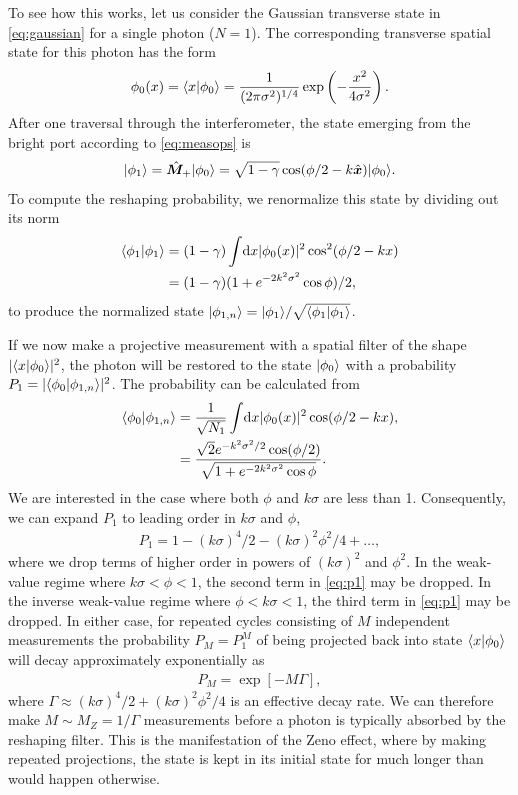 To see how this works, let us consider the Gaussian transverse state in \eqref{eq:gaussian} for a single photon ($N=1$).  The corresponding transverse spatial state for this photon has the form
\begin{align}
  \phi_0(x) = \langle x \vert \phi_0 \rangle = \frac{1}{(2 \pi \sigma^2)^{1/4}} \exp \left( - \frac{x^2}{4 \sigma^2}\right).
\end{align}
After one traversal through the interferometer, the state emerging from the bright port according to \eqref{eq:measops} is  
\begin{align}
  \lvert \phi_1\rangle = \hat{\bm M}_+ \lvert \phi_0\rangle = \sqrt{1-\gamma} \cos( \phi/2 - k  \hat{\bm x}) \lvert \phi_0\rangle.
\end{align}
To compute the reshaping probability, we renormalize this state by dividing out its norm 
\begin{align}
  \langle \phi_1 \vert \phi_1 \rangle &= (1- \gamma) \int \! \textrm{d}x |\phi_0(x)|^2  \cos^2( \phi/2 - k x) \\
  &= (1- \gamma) (1 + e^{-2 k^2 \sigma^2} \cos \phi)/2, \nonumber
\end{align}
to produce the normalized state $\lvert \phi_{1,n}\rangle = \lvert \phi_1\rangle /\sqrt{\langle \phi_1 \vert \phi_1 \rangle}$.

If we now make a projective measurement with a spatial filter of the shape $|\langle x \vert \phi_0 \rangle|^2$, the photon will be restored to the state $\lvert \phi_0\rangle$ with a probability $P_1 =  |\langle \phi_0 \vert \phi_{1,n} \rangle|^2$.  The probability can be calculated from
\begin{align}
  \langle \phi_0 \vert \phi_{1,n} \rangle &= \frac{1}{\sqrt{N_1}} \int \! \textrm{d}x |\phi_0(x)|^2 \cos( \phi/2 - k x), \\
  &= \frac{\sqrt{2} e^{-k^2 \sigma^2/2} \cos (\phi/2)}{\sqrt{1 + e^{-2 k^2 \sigma^2} \cos \phi}}. \nonumber
\end{align}
We are interested in the case where both $\phi$ and $k \sigma$ are less than 1.  Consequently, we can expand $P_1$ to leading order in $k \sigma$ and $\phi$,
\begin{align}\label{eq:p1}
  P_1 = 1 - (k \sigma)^4/2 - (k \sigma)^2 \phi^2/4 + \dots,
\end{align}
where we drop terms of higher order in powers of $(k \sigma)^2$ and $\phi^2$.  In the weak-value regime where $k\sigma < \phi < 1$, the second term in \eqref{eq:p1} may be dropped.  In the inverse weak-value regime where $\phi < k\sigma < 1$, the third term in \eqref{eq:p1} may be dropped.  In either case, for repeated cycles consisting of $M$ independent measurements the probability $P_M = P_1^M$ of being projected back into state $\langle x \vert \phi_0 \rangle$ will decay approximately exponentially as 
\begin{align}
  P_M = \exp [ -M \Gamma],
\end{align}
where $\Gamma \approx (k \sigma)^4/2 + (k \sigma)^2 \phi^2/4$ is an effective decay rate.  We can therefore make $M \sim M_Z = 1/\Gamma$ measurements before a photon is typically absorbed by the reshaping filter.  This is the manifestation of the Zeno effect, where by making repeated projections, the state is kept in its initial state for much longer than would happen otherwise.

